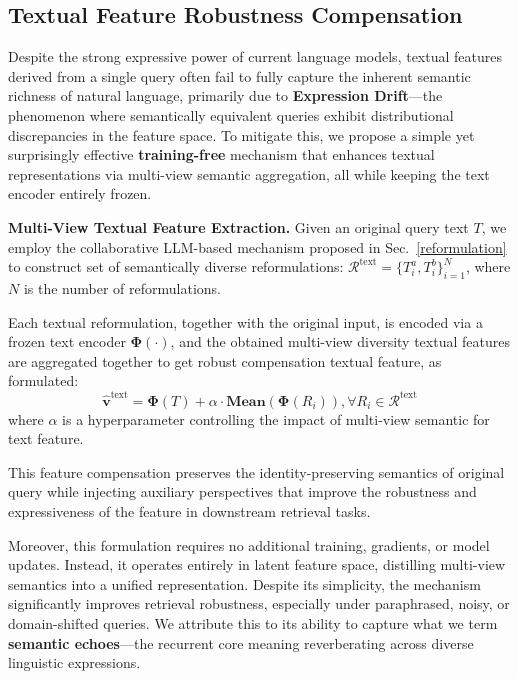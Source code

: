 \subsection{Textual Feature Robustness Compensation} \label{3.3}

Despite the strong expressive power of current language models, textual features derived from a single query often fail to fully capture the inherent semantic richness of natural language, primarily due to \textbf{Expression Drift}---the phenomenon where semantically equivalent queries exhibit distributional discrepancies in the feature space. To mitigate this, we propose a simple yet surprisingly effective \textbf{training-free} mechanism that enhances textual representations via multi-view semantic aggregation, all while keeping the text encoder entirely frozen.


\noindent\textbf{Multi-View Textual Feature Extraction.}
Given an original query text \( T \), we employ the collaborative LLM-based mechanism proposed in Sec.~\ref{reformulation} to construct set of semantically diverse reformulations: 
\(\mathcal{R}^{\text{text}} = \{T^{a}_{i}, T^{b}_{i}\}_{i=1}^{N}\), where $N$ is the number of reformulations.


Each textual reformulation, together with the original input, is encoded via a frozen text encoder \( \boldsymbol{\Phi}(\cdot) \)\cite{hu2024empowering}, and the obtained multi-view diversity textual features are aggregated together to get robust compensation textual feature, as formulated:
\begin{equation}
    \hat{\mathbf{v}}^{\text{text}} = \mathbf{\Phi}(T) + \alpha \cdot \textbf{Mean}(\mathbf{\Phi}(R_i)), \forall R_i \in \mathcal{R}^{\text{text}}
\label{eq:alpha}
\end{equation}
where $\alpha$ is a hyperparameter controlling the impact of multi-view semantic for text feature.

This feature compensation preserves the identity-preserving semantics of original query while injecting auxiliary perspectives that improve the robustness and expressiveness of the feature in downstream retrieval tasks.

Moreover, this formulation requires no additional training, gradients, or model updates. Instead, it operates entirely in latent feature space, distilling multi-view semantics into a unified representation. Despite its simplicity, the mechanism significantly improves retrieval robustness, especially under paraphrased, noisy, or domain-shifted queries. We attribute this to its ability to capture what we term \textbf{semantic echoes}---the recurrent core meaning reverberating across diverse linguistic expressions.

